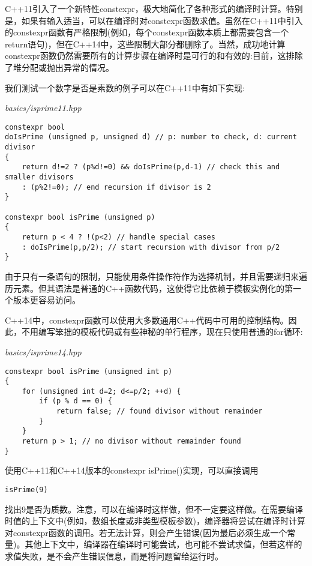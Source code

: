 C++11引入了一个新特性constexpr，极大地简化了各种形式的编译时计算。特别是，如果有输入适当，可以在编译时对constexpr函数求值。虽然在C++11中引入的constexpr函数有严格限制(例如，每个constexpr函数本质上都需要包含一个return语句)，但在C++14中，这些限制大部分都删除了。当然，成功地计算constexpr函数仍然需要所有的计算步骤在编译时是可行的和有效的:目前，这排除了堆分配或抛出异常的情况。

我们测试一个数字是否是素数的例子可以在C++11中有如下实现:

\noindent
\textit{basics/isprime11.hpp}
\begin{lstlisting}[style=styleCXX]
constexpr bool
doIsPrime (unsigned p, unsigned d) // p: number to check, d: current divisor
{
	return d!=2 ? (p%d!=0) && doIsPrime(p,d-1) // check this and smaller divisors
	: (p%2!=0); // end recursion if divisor is 2
}

constexpr bool isPrime (unsigned p)
{
	return p < 4 ? !(p<2) // handle special cases
	: doIsPrime(p,p/2); // start recursion with divisor from p/2
}
\end{lstlisting}

由于只有一条语句的限制，只能使用条件操作符作为选择机制，并且需要递归来遍历元素。但其语法是普通的C++函数代码，这使得它比依赖于模板实例化的第一个版本更容易访问。

C++14中，constexpr函数可以使用大多数通用C++代码中可用的控制结构。因此，不用编写笨拙的模板代码或有些神秘的单行程序，现在只使用普通的for循环:

\noindent
\textit{basics/isprime14.hpp}
\begin{lstlisting}[style=styleCXX]
constexpr bool isPrime (unsigned int p)
{
	for (unsigned int d=2; d<=p/2; ++d) {
		if (p % d == 0) {
			return false; // found divisor without remainder
		}
	}
	return p > 1; // no divisor without remainder found
}
\end{lstlisting}

使用C++11和C++14版本的constexpr isPrime()实现，可以直接调用

\begin{lstlisting}[style=styleCXX]
isPrime(9)
\end{lstlisting}

找出9是否为质数。注意，可以在编译时这样做，但不一定要这样做。在需要编译时值的上下文中(例如，数组长度或非类型模板参数)，编译器将尝试在编译时计算对constexpr函数的调用。若无法计算，则会产生错误(因为最后必须生成一个常量)。其他上下文中，编译器在编译时可能尝试，也可能不尝试求值，但若这样的求值失败，是不会产生错误信息，而是将问题留给运行时。

